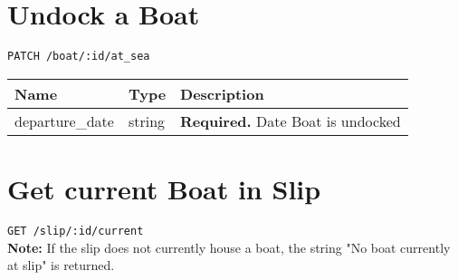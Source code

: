 \documentclass{article}
\begin{document}
\section*{Undock a Boat}
\texttt{PATCH /boat/:id/at\_sea} \\
\begin{tabular}{| l | l | l |}
	\hline
	\textbf{Name} & \textbf{Type} & \textbf{Description} \\
	\hline
	departure\_date & string        & \textbf{Required.} Date Boat is undocked \\
	\hline
\end{tabular}

\section*{Get current Boat in Slip}
\texttt{GET /slip/:id/current} \\
\textbf{Note:} If the slip does not currently house a boat, the string
"No boat currently at slip" is returned.
\end{document}
